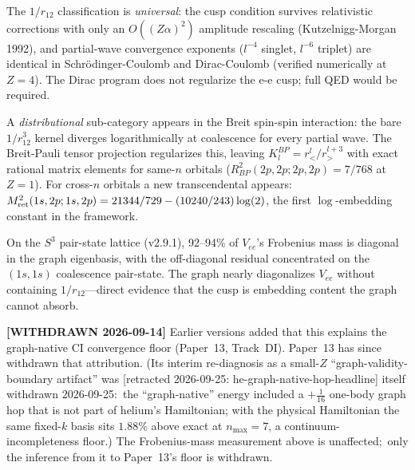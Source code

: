 \documentclass[aps,pra,twocolumn,superscriptaddress,longbibliography]{revtex4-2}
\newcommand{\gvq}[2]{#2}%
\begin{document}
\begin{enumerate}
    The $1/r_{12}$ classification is \emph{universal}: the cusp
    condition survives relativistic corrections with only an
    $O((Z\alpha)^2)$ amplitude rescaling (Kutzelnigg-Morgan 1992), and
    partial-wave convergence exponents ($l^{-4}$ singlet, $l^{-6}$
    triplet) are identical in Schr\"odinger-Coulomb and Dirac-Coulomb
    (verified numerically at $Z=4$).  The Dirac program does not
    regularize the e-e cusp; full QED would be required.

    A \emph{distributional} sub-category appears in the Breit spin-spin
    interaction: the bare $1/r_{12}^3$ kernel diverges logarithmically
    at coalescence for every partial wave.  The Breit-Pauli tensor
    projection regularizes this, leaving $K_l^{BP} = r_<^l / r_>^{l+3}$
    with exact rational matrix elements for same-$n$ orbitals
    ($R_{BP}^2(2p,2p;2p,2p) = 7/768$ at $Z=1$).  For cross-$n$
    orbitals a new transcendental appears:
    $M_{\rm ret}^2(1s,2p;1s,2p) = 21344/729 - (10240/243)\log(2)$,
    the first $\log$-embedding constant in the framework.

    On the $S^3$ pair-state lattice (v2.9.1), 92--94\% of $V_{ee}$'s
    Frobenius mass is diagonal in the graph eigenbasis, with the
    off-diagonal residual concentrated on the $(1s,1s)$ coalescence
    pair-state.  The graph nearly diagonalizes $V_{ee}$ without
    containing $1/r_{12}$---direct evidence that the cusp is embedding
    content the graph cannot absorb.

    \textbf{[WITHDRAWN 2026-09-14]} Earlier versions added that this
    explains the graph-native CI convergence floor (Paper~13, Track~DI).
    Paper~13 has since withdrawn that attribution.  (Its interim
    re-diagnosis as a small-$Z$ ``graph-validity-boundary artifact'' was [retracted 2026-09-25: he-graph-native-hop-headline]
    itself withdrawn 2026-09-25:\ the ``graph-native'' energy included a
    $+\tfrac{1}{16}$ one-body graph hop that is not part of helium's
    Hamiltonian; with the physical Hamiltonian the same fixed-$k$ basis
    sits $\gvq{he_gn_phys_n7_pct}{1.88}\%$ above exact at $n_{\max}=7$, a
    continuum-incompleteness floor.)  The Frobenius-mass measurement
    above is unaffected;\ only the inference from it to Paper~13's floor
    is withdrawn.


\end{enumerate}
\end{document}
